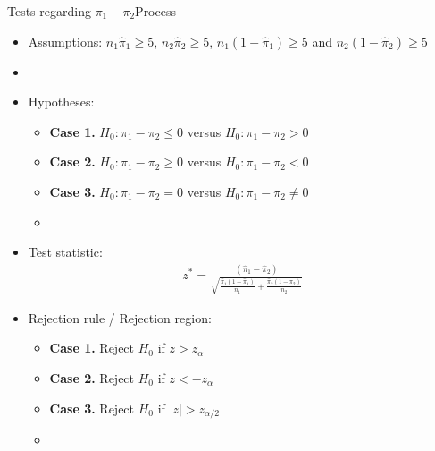 \documentclass[xcolor=dvipsnames]{beamer}
\begin{document}
\begin{frame}{Tests regarding $\pi_1 - \pi_2$}{Process}
	\begin{itemize}
 \item Assumptions: $n_1 \hat{\pi}_1 \geq 5$, $n_2 \hat{\pi}_2 \geq 5$, $n_1 (1-\hat{\pi}_1) \geq 5$ and $n_2 (1-\hat{\pi}_2) \geq 5$  \pause
		\item[]
		\item Hypotheses:  \pause
		\begin{itemize}
			\item \textbf{Case 1.} $H_0: \pi_1-\pi_2 \leq 0$ versus $H_0: \pi_1-\pi_2 > 0$  \pause
			\item \textbf{Case 2.} $H_0: \pi_1-\pi_2 \geq 0$ versus $H_0: \pi_1-\pi_2 < 0$ \pause
			\item \textbf{Case 3.} $H_0: \pi_1-\pi_2 = 0$ versus $H_0: \pi_1-\pi_2 \neq 0$ \pause
			\item[]
		\end{itemize}
		
		\item Test statistic:  \pause
		\begin{gather*}
		z^*=\frac{(\hat{\pi}_1 - \hat{\pi}_2)}{\sqrt{\frac{\hat{\pi}_1 (1-\hat{\pi}_1)}{n_1}+\frac{\hat{\pi}_2 (1-\hat{\pi}_2)}{n_2}}}
		\end{gather*}  \pause
		\item Rejection rule / Rejection region:  \pause
		\begin{itemize}
			\item \textbf{Case 1.} Reject $H_0$ if $z > z_{\alpha}$  \pause
			\item \textbf{Case 2.} Reject $H_0$ if $z < -z_{\alpha}$  \pause
			\item \textbf{Case 3.} Reject $H_0$ if $|z| > z_{\alpha / 2}$
			\item[]
		\end{itemize}
	\end{itemize}
\end{frame}
\end{document}
